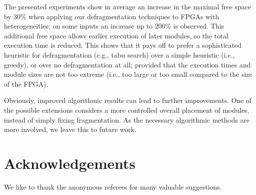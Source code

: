 \documentclass{article}
\begin{document}
The presented experiments show in average an increase in the maximal
free space by $30\%$ when applying our defragmentation techniques to 
FPGAs with heterogeneities; on some inputs an increase up to $200\%$
is observed. This additional free space allows earlier execution of
later modules,
so the total execution time is
reduced. This shows that it pays off to prefer a sophisticated heuristic 
for defragmentation (e.g., tabu search) 
over a simple heuristic (i.e., greedy), or over no 
defragmentation at all; provided that the execution times and module sizes 
are not too extreme (i.e., too large or too small compared to the size
of the FPGA).

Obviously, improved algorithmic results can lead to further
improvements. One of the possible extensions considers a more
controlled overall placement of modules, instead of simply fixing
fragmentation. As the necessary algorithmic methods are more involved,
we leave this to future work.

\section*{Acknowledgements}
We like to thank the anonymous referees for many valuable 
suggestions.

\small
\end{document}
